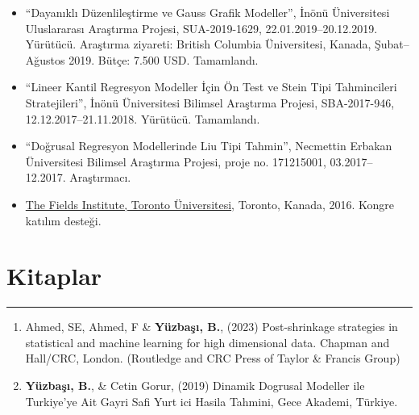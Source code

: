 \documentclass[10pt,a4paper]{article}
\newcommand{\NewPart}[2]{%
	\Needspace{7\baselineskip}%
	\vspace{0.45em}%
	\section*{\sffamily\large\bfseries\color{MidnightBlue}#1 #2}%
	\vspace{-0.7em}\noindent\color{MidnightBlue}\rule{\textwidth}{0.55pt}\color{Black}\vspace{0.25em}}
\newenvironment{etaremune}{\begin{enumerate}}{\end{enumerate}}
\begin{document}
\begin{itemize}
\item ``Dayanıklı Düzenlileştirme ve Gauss Grafik Modeller'', İnönü Üniversitesi Uluslararası Araştırma Projesi, SUA-2019-1629, 22.01.2019--20.12.2019. Yürütücü. Araştırma ziyareti: British Columbia Üniversitesi, Kanada, Şubat--Ağustos 2019. Bütçe: 7.500 USD. Tamamlandı.
 
\item ``Lineer Kantil Regresyon Modeller İçin Ön Test ve Stein Tipi Tahmincileri Stratejileri'', İnönü Üniversitesi Bilimsel Araştırma Projesi, SBA-2017-946, 12.12.2017--21.11.2018. Yürütücü. Tamamlandı.

\item ``Doğrusal Regresyon Modellerinde Liu Tipi Tahmin'', Necmettin Erbakan Üniversitesi Bilimsel Araştırma Projesi, proje no. 171215001, 03.2017--12.2017. Araştırmacı.


\item \href{http://www.fields.utoronto.ca}{The Fields Institute, Toronto Üniversitesi}, Toronto, Kanada, 2016. Kongre katılım desteği.



\end{itemize}


\NewPart{Kitaplar}{}
\begin{etaremune}
\renewcommand{\theenumi}{B\arabic{enumi}}

\item Ahmed, SE, Ahmed, F \& {\bf Y\"{u}zba\c{s}{\i}, B.}, (2023) Post-shrinkage strategies in statistical and machine learning for high dimensional data. Chapman and Hall/CRC, London. (Routledge and CRC Press of Taylor \& Francis Group)



\item {\bf Y\"{u}zba\c{s}{\i}, B.},  \& Cetin Gorur, (2019) Dinamik Dogrusal Modeller ile Turkiye'ye Ait Gayri Safi Yurt ici Hasila Tahmini, Gece Akademi, Türkiye.

\end{etaremune}
\end{document}
